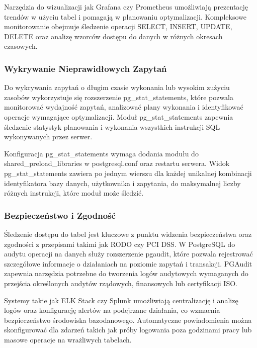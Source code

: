 \documentclass[letterpaper,10pt,polish]{sphinxmanual}
\begin{document}
\sphinxAtStartPar
Narzędzia do wizualizacji jak Grafana czy Prometheus umożliwiają prezentację trendów w użyciu tabel i pomagają w planowaniu optymalizacji. Kompleksowe monitorowanie obejmuje śledzenie operacji SELECT, INSERT, UPDATE, DELETE oraz analizę wzorców dostępu do danych w różnych okresach czasowych.


\subsubsection{Wykrywanie Nieprawidłowych Zapytań}
\label{\detokenize{rozdzial2/repo-wspolne/index:wykrywanie-nieprawidlowych-zapytan}}
\sphinxAtStartPar
Do wykrywania zapytań o długim czasie wykonania lub wysokim zużyciu zasobów wykorzystuje się rozszerzenie pg\_stat\_statements, które pozwala monitorować wydajność zapytań, analizować plany wykonania i identyfikować operacje wymagające optymalizacji. Moduł pg\_stat\_statements zapewnia śledzenie statystyk planowania i wykonania wszystkich instrukcji SQL wykonywanych przez serwer.

\sphinxAtStartPar
Konfiguracja pg\_stat\_statements wymaga dodania modułu do shared\_preload\_libraries w postgresql.conf oraz restartu serwera. Widok pg\_stat\_statements zawiera po jednym wierszu dla każdej unikalnej kombinacji identyfikatora bazy danych, użytkownika i zapytania, do maksymalnej liczby różnych instrukcji, które moduł może śledzić.


\subsubsection{Bezpieczeństwo i Zgodność}
\label{\detokenize{rozdzial2/repo-wspolne/index:bezpieczenstwo-i-zgodnosc}}
\sphinxAtStartPar
Śledzenie dostępu do tabel jest kluczowe z punktu widzenia bezpieczeństwa oraz zgodności z przepisami takimi jak RODO czy PCI DSS. W PostgreSQL do audytu operacji na danych służy rozszerzenie pgaudit, które pozwala rejestrować szczegółowe informacje o działaniach na poziomie zapytań i transakcji. PGAudit zapewnia narzędzia potrzebne do tworzenia logów audytowych wymaganych do przejścia określonych audytów rządowych, finansowych lub certyfikacji ISO.

\sphinxAtStartPar
Systemy takie jak ELK Stack czy Splunk umożliwiają centralizację i analizę logów oraz konfigurację alertów na podejrzane działania, co wzmacnia bezpieczeństwo środowiska bazodanowego. Automatyczne powiadomienia można skonfigurować dla zdarzeń takich jak próby logowania poza godzinami pracy lub masowe operacje na wrażliwych tabelach.
\end{document}
